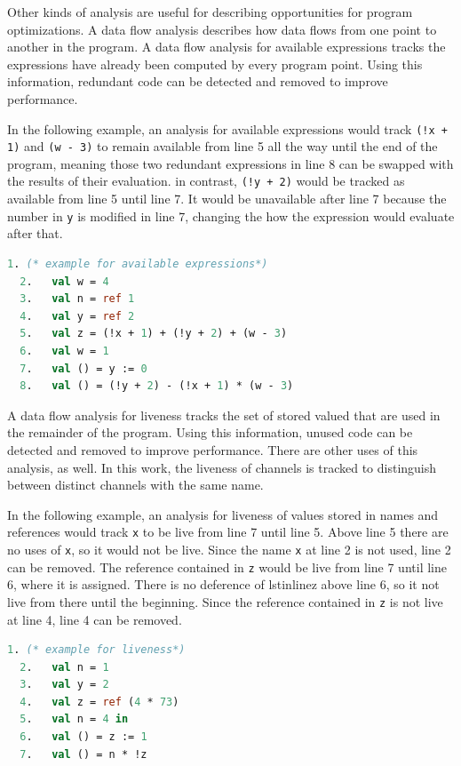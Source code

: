 \documentclass[10pt]{article}
\begin{document}
Other kinds of analysis are useful for describing opportunities for program optimizations.
A data flow analysis describes how data flows from one point to another in the program.
A data flow analysis for available expressions tracks the expressions have already been
computed by every program point. Using this information, redundant code can be detected and
removed to improve performance.

In the following example, an analysis for available expressions would track
\lstinline{(!x + 1)} and \lstinline{(w - 3)} to remain available from line 5 all the way until
the end of the program, meaning those two redundant expressions in line 8 can be swapped with
the results of their evaluation. in contrast, \lstinline{(!y + 2)} would be tracked as
available
from line 5 until line 7. It would be unavailable after line 7 because the number in
\lstinline{y} is modified in line 7, changing the how the expression would evaluate after
that.

\begin{lstlisting}[language=ML, mathescape]
  1. (* example for available expressions*) 
  2.   val w = 4
  3.   val n = ref 1
  4.   val y = ref 2
  5.   val z = (!x + 1) + (!y + 2) + (w - 3)
  6.   val w = 1
  7.   val () = y := 0
  8.   val () = (!y + 2) - (!x + 1) * (w - 3)
  \end{lstlisting}

A data flow analysis for liveness tracks the set of stored valued that are used in the
remainder of the program. Using this information, unused code can
be detected and removed to improve performance. There are other uses of this analysis, as well.
In this work, the liveness of channels is tracked to distinguish between distinct channels with
the same name. 

In the following example, an analysis for liveness of values stored in names and references
would track \lstinline{x} to be live from line 7 until line 5. Above line 5 there are no uses
of \lstinline{x}, so it would not be live. Since the name \lstinline{x} at line 2 is not used,
line 2 can be removed. The reference contained in \lstinline{z} would be
live from line 7 until line 6, where it is assigned. There is no deference of lstinline{z}
above line 6, so it not live from there until the beginning. Since the reference contained in
\lstinline{z} is not live at line 4, line 4 can be removed.

\begin{lstlisting}[language=ML, mathescape]
  1. (* example for liveness*) 
  2.   val n = 1  
  3.   val y = 2
  4.   val z = ref (4 * 73)
  5.   val n = 4 in 
  6.   val () = z := 1
  7.   val () = n * !z
  \end{lstlisting}
\end{document}
